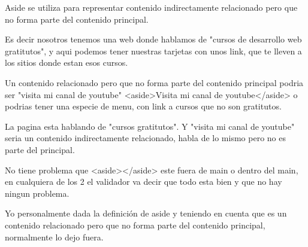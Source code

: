 Aside se utiliza para representar contenido indirectamente relacionado pero que no forma parte del contenido principal.

Es decir nosotros tenemos una web donde hablamos de "cursos de desarrollo web gratitutos", y aqui podemos tener nuestras tarjetas con unos link, que te lleven a los sitios donde estan esos cursos.


Un contenido relacionado pero que no forma parte del contenido principal podria ser "visita mi canal de youtube"
<aside>Visita mi canal de youtube</aside> o podrias tener una especie de menu, con link a cursos que no son gratitutos.


La pagina esta hablando de "cursos gratitutos".
Y "visita mi canal de youtube" seria un contenido indirectamente relacionado, habla de lo mismo pero no es parte del principal.


No tiene problema que <aside></aside> este fuera de main o dentro del main, en cualquiera de los 2 el validador va decir que todo esta bien y que no hay ningun problema.


Yo personalmente dada la definición de aside y teniendo en cuenta que es un contenido relacionado pero que no forma parte del contenido principal, normalmente lo dejo fuera.